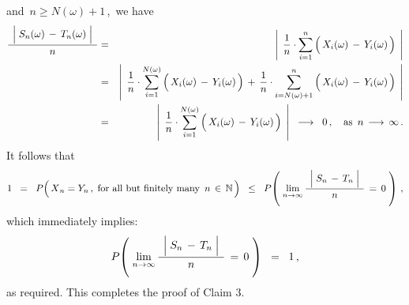 \begin{enumerate}
and \,$n \geq N(\omega)+1$\,,\, we have
\begin{eqnarray*}
\dfrac{{\color{white}.}
	\left\vert\;
	S_{n}(\omega) \,\overset{{\color{white}.}}{-}\, T_{n}(\omega)
	\;\right\vert
	{\color{white}.}}{
	n
	}
& = &
	\left\vert\;\,
		\dfrac{1}{n}\cdot
		\overset{n}{\underset{i=1}{\sum}}
		\left(\,X_{i}(\omega) \,\overset{{\color{white}.}}{-}\, Y_{i}(\omega)\,\right)
		\;\,\right\vert
\\
& = &
	\left\vert\;\,
		\dfrac{1}{n}\cdot
		\overset{N(\omega)}{\underset{i=1}{\sum}}
		\left(\,X_{i}(\omega) \,\overset{{\color{white}.}}{-}\, Y_{i}(\omega)\,\right)
		\,+\,
		\dfrac{1}{n}\cdot
		\overset{n}{\underset{i=N(\omega)+1}{\sum}}
		\left(\,X_{i}(\omega) \,\overset{{\color{white}.}}{-}\, Y_{i}(\omega)\,\right)
		\;\,\right\vert
\\
& = &
	\left\vert\;\,
		\dfrac{1}{n}\cdot
		\overset{N(\omega)}{\underset{i=1}{\sum}}
		\left(\,X_{i}(\omega) \,\overset{{\color{white}.}}{-}\, Y_{i}(\omega)\,\right)
		\;\,\right\vert
	\;\; \longrightarrow \;\; 0\,,
	\quad\textnormal{as \,$n \, \longrightarrow \, \infty$}\,.
\end{eqnarray*}
It follows that
\begin{equation*}
1
\;\; = \;\; 
	P\!\left(\,\overset{{\color{white}.}}{X}_{n} = Y_{n}\,,\;\textnormal{for all but finitely many \,$n\,\in\,\N$}\,\right)
\;\; \leq \;\;
	P\!\left(\;
		\underset{n\rightarrow\infty}{\lim}\,
		\dfrac{{\color{white}.}
			\left\vert\;
			S_{n} \,\overset{{\color{white}.}}{-}\, T_{n}
			\;\right\vert
			{\color{white}.}}{
			n
			}
			\,=\, 0
		\;\right)\,,
\end{equation*}
which immediately implies:
\begin{equation*}
P\!\left(\;
	\underset{n\rightarrow\infty}{\lim}\,
	\dfrac{{\color{white}.}
		\left\vert\;
		S_{n} \,\overset{{\color{white}.}}{-}\, T_{n}
		\;\right\vert
		{\color{white}.}}{
		n
		}
		\,=\, 0
	\;\right)
\;\; = \;\;
	1\,,
\end{equation*}
as required.
This completes the proof of Claim 3.


\end{enumerate}
